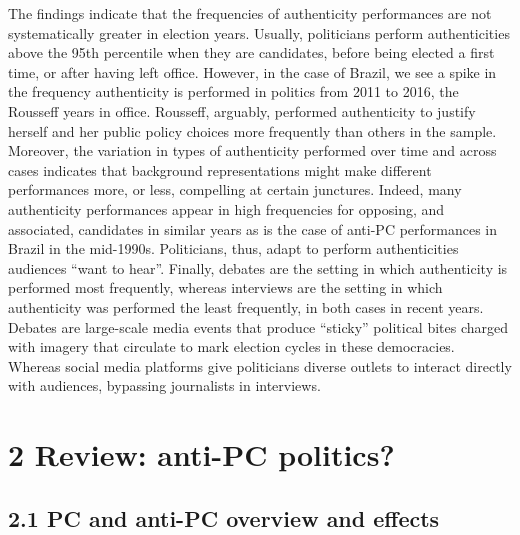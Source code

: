 \documentclass[
  12pt,
]{article}
\begin{document}
The findings indicate that the frequencies of authenticity performances
are not systematically greater in election years. Usually, politicians
perform authenticities above the 95th percentile when they are
candidates, before being elected a first time, or after having left
office. However, in the case of Brazil, we see a spike in the frequency
authenticity is performed in politics from 2011 to 2016, the Rousseff
years in office. Rousseff, arguably, performed authenticity to justify
herself and her public policy choices more frequently than others in the
sample. Moreover, the variation in types of authenticity performed over
time and across cases indicates that background representations might
make different performances more, or less, compelling at certain
junctures. Indeed, many authenticity performances appear in high
frequencies for opposing, and associated, candidates in similar years as
is the case of anti-PC performances in Brazil in the mid-1990s.
Politicians, thus, adapt to perform authenticities audiences ``want to
hear''. Finally, debates are the setting in which authenticity is
performed most frequently, whereas interviews are the setting in which
authenticity was performed the least frequently, in both cases in recent
years. Debates are large-scale media events that produce ``sticky''
political bites charged with imagery that circulate to mark election
cycles in these democracies. Whereas social media platforms give
politicians diverse outlets to interact directly with audiences,
bypassing journalists in interviews.

\hypertarget{review-anti-pc-politics}{%
\section{2 Review: anti-PC politics?}\label{review-anti-pc-politics}}

\hypertarget{pc-and-anti-pc-overview-and-effects}{%
\subsection{2.1 PC and anti-PC overview and
effects}\label{pc-and-anti-pc-overview-and-effects}}
\end{document}

